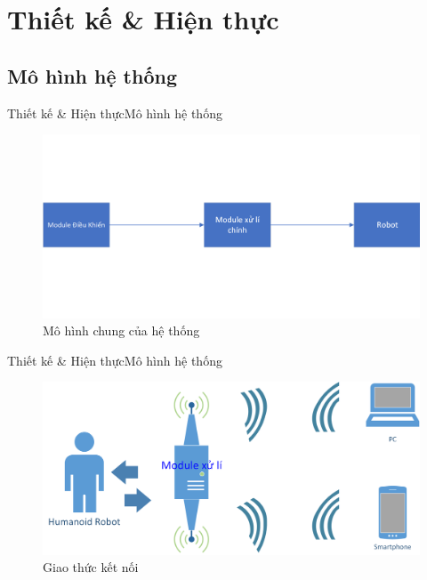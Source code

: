 \documentclass[compress, blue, 13pt,hyperref={pdfpagemode=FullScreen}]{beamer}
\begin{document}
\section{Thiết kế \& Hiện thực}
\subsection{Mô hình hệ thống}
\begin{frame}{Thiết kế \& Hiện thực}{Mô hình hệ thống}
\transblindshorizontal
\begin{figure}[hbtp]
\centering
\includegraphics[scale=0.65]{images/overview.png}
\caption{Mô hình chung của hệ thống}
\end{figure}
\end{frame}
\begin{frame}{Thiết kế \& Hiện thực}{Mô hình hệ thống}
\transblindshorizontal
\begin{figure}[hbtp]
\centering
\includegraphics[scale=0.5]{images/protocol.png}
\caption{Giao thức kết nối}
\end{figure}
\end{frame}
\end{document}
